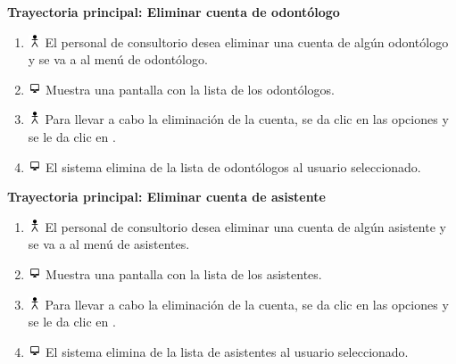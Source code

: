 \textbf{Trayectoria principal: Eliminar cuenta de odontólogo}
\begin{enumerate}
\item \includegraphics[height=1em]{pictures/actor.png} El personal de consultorio desea eliminar una cuenta de algún odontólogo y se va a al menú de odontólogo.
\item \includegraphics[height=1em]{pictures/sistema.png} Muestra una pantalla con la lista de los odontólogos.
\item \includegraphics[height=1em]{pictures/actor.png} Para llevar a cabo la eliminación de la cuenta, se da clic en las opciones y se le da clic en .
\item \includegraphics[height=1em]{pictures/sistema.png} El sistema elimina de la lista de odontólogos al usuario seleccionado.
\end{enumerate} \bigskip


\textbf{Trayectoria principal: Eliminar cuenta de asistente}
\begin{enumerate}
\item \includegraphics[height=1em]{pictures/actor.png} El personal de consultorio desea eliminar una cuenta de algún asistente y se va a al menú de asistentes.
\item \includegraphics[height=1em]{pictures/sistema.png} Muestra una pantalla con la lista de los asistentes.
\item \includegraphics[height=1em]{pictures/actor.png} Para llevar a cabo la eliminación de la cuenta, se da clic en las opciones y se le da clic en .
\item \includegraphics[height=1em]{pictures/sistema.png} El sistema elimina de la lista de asistentes al usuario seleccionado.
\end{enumerate} \bigskip



